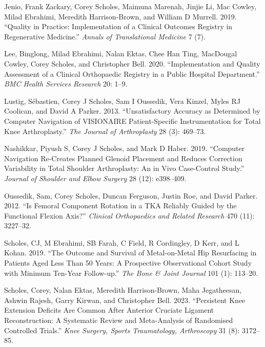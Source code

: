 \documentclass[
  letterpaper,
  DIV=11,
  numbers=noendperiod]{scrartcl}
\newlength{\cslhangindent}
\newenvironment{CSLReferences}[2] %
 {\begin{list}{}{%
  \setlength{\itemindent}{0pt}
  \setlength{\leftmargin}{0pt}
  \setlength{\parsep}{0pt}
  \ifodd #1
   \setlength{\leftmargin}{\cslhangindent}
   \setlength{\itemindent}{-1\cslhangindent}
  \fi
  \setlength{\itemsep}{#2\baselineskip}}}
 {\end{list}}
\begin{document}
\begin{CSLReferences}{1}{0}
Jenio, Frank Zackary, Corey Scholes, Maimuna Marenah, Jinjie Li, Mac
Cowley, Milad Ebrahimi, Meredith Harrison-Brown, and William D Murrell.
2019. {``Quality in Practice: Implementation of a Clinical Outcomes
Registry in Regenerative Medicine.''} \emph{Annals of Translational
Medicine} 7 (7).

Lee, Binglong, Milad Ebrahimi, Nalan Ektas, Chee Han Ting, MacDougal
Cowley, Corey Scholes, and Christopher Bell. 2020. {``Implementation and
Quality Assessment of a Clinical Orthopaedic Registry in a Public
Hospital Department.''} \emph{BMC Health Services Research} 20: 1--9.

Lustig, Sébastien, Corey J Scholes, Sam I Oussedik, Vera Kinzel, Myles
RJ Coolican, and David A Parker. 2013. {``Unsatisfactory Accuracy as
Determined by Computer Navigation of VISIONAIRE Patient-Specific
Instrumentation for Total Knee Arthroplasty.''} \emph{The Journal of
Arthroplasty} 28 (3): 469--73.

Nashikkar, Piyush S, Corey J Scholes, and Mark D Haber. 2019.
{``Computer Navigation Re-Creates Planned Glenoid Placement and Reduces
Correction Variability in Total Shoulder Arthroplasty: An in Vivo
Case-Control Study.''} \emph{Journal of Shoulder and Elbow Surgery} 28
(12): e398--409.

Oussedik, Sam, Corey Scholes, Duncan Ferguson, Justin Roe, and David
Parker. 2012. {``Is Femoral Component Rotation in a TKA Reliably Guided
by the Functional Flexion Axis?''} \emph{Clinical Orthopaedics and
Related Research{\textregistered}} 470 (11): 3227--32.

Scholes, CJ, M Ebrahimi, SB Farah, C Field, R Cordingley, D Kerr, and L
Kohan. 2019. {``The Outcome and Survival of Metal-on-Metal Hip
Resurfacing in Patients Aged Less Than 50 Years: A Prospective
Observational Cohort Study with Minimum Ten-Year Follow-up.''} \emph{The
Bone \& Joint Journal} 101 (1): 113--20.

Scholes, Corey, Nalan Ektas, Meredith Harrison-Brown, Maha Jegatheesan,
Ashwin Rajesh, Garry Kirwan, and Christopher Bell. 2023. {``Persistent
Knee Extension Deficits Are Common After Anterior Cruciate Ligament
Reconstruction: A Systematic Review and Meta-Analysis of Randomised
Controlled Trials.''} \emph{Knee Surgery, Sports Traumatology,
Arthroscopy} 31 (8): 3172--85.


\end{CSLReferences}
\end{document}
